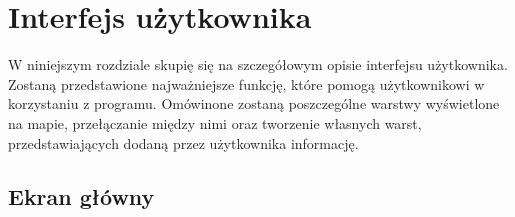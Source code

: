 \chapter{Interfejs użytkownika}
\label{cha:UI}
W niniejszym rozdziale skupię się na szczegółowym opisie interfejsu użytkownika. Zostaną przedstawione najważniejsze funkcję, które pomogą użytkownikowi w korzystaniu z programu. Omówinone zostaną poszczególne warstwy wyświetlone na mapie, przełączanie między nimi oraz tworzenie własnych warst, przedstawiających dodaną przez użytkownika informację.

\section{Ekran główny}
\label{sec:ekranGlowny}